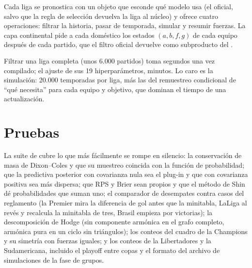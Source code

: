  Cada liga se pronostica con un objeto  que esconde qué modelo usa (el oficial, salvo que la regla de selección devuelva la liga al núcleo) y ofrece cuatro operaciones: filtrar la historia, pasar de temporada, simular y resumir fuerzas. La capa continental pide a cada  doméstico los estados $(a,b,f,g)$ de cada equipo después de cada partido, que el filtro oficial devuelve como subproducto del .

 Filtrar una liga completa (unos 6.000 partidos) toma segundos una vez compilado; el ajuste de sus 19 hiperparámetros, minutos. Lo caro es la simulación: 20.000 temporadas por liga, más las del remuestreo condicional de ``qué necesita'' para cada equipo y objetivo, que dominan el tiempo de una actualización.

\section{Pruebas}

La suite de  cubre lo que más fácilmente se rompe en silencio: la conservación de masa de Dixon–Coles y que su muestreo coincida con la función de probabilidad; que la predictiva posterior con covarianza nula sea el plug-in y que con covarianza positiva sea más dispersa; que RPS y Brier sean propios y que el método de Shin dé probabilidades que suman uno; el comparador de desempates contra casos del reglamento (la Premier mira la diferencia de gol antes que la minitabla, LaLiga al revés y recalcula la minitabla de tres, Brasil empieza por victorias); la descomposición de Hodge (sin componente armónica en el grafo completo, armónica pura en un ciclo sin triángulos); los conteos del cuadro de la Champions y su simetría con fuerzas iguales; y los conteos de la Libertadores y la Sudamericana, incluido el playoff entre copas y el formato del archivo de simulaciones de la fase de grupos.
